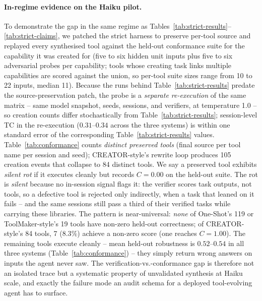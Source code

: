 \documentclass[sigconf,anonymous,natbib=false]{acmart}
\begin{document}
\paragraph{In-regime evidence on the Haiku pilot.} To demonstrate the gap in the same regime as Tables~\ref{tab:strict-results}--\ref{tab:strict-claims}, we patched the strict harness to preserve per-tool source and replayed every synthesised tool against the held-out conformance suite for the capability it was created for (five to six hidden unit inputs plus five to six adversarial probes per capability; tools whose creating task links multiple capabilities are scored against the union, so per-tool suite sizes range from 10 to 22 inputs, median 11). Because the runs behind Table~\ref{tab:strict-results} predate the source-preservation patch, the probe is a \emph{separate re-execution} of the same matrix -- same model snapshot, seeds, sessions, and verifiers, at temperature 1.0 -- so creation counts differ stochastically from Table~\ref{tab:strict-results}; session-level TC in the re-execution ($0.31$--$0.34$ across the three systems) is within one standard error of the corresponding Table~\ref{tab:strict-results} values. Table~\ref{tab:conformance} counts \emph{distinct preserved tools} (final source per tool name per session and seed); CREATOR-style's rewrite loop produces 105 creation events that collapse to 84 distinct tools. We say a preserved tool exhibits \emph{silent rot} if it executes cleanly but records $C{=}0.00$ on the held-out suite. The rot is \emph{silent} because no in-session signal flags it: the verifier scores task outputs, not tools, so a defective tool is rejected only indirectly, when a task that leaned on it fails -- and the same sessions still pass a third of their verified tasks while carrying these libraries. The pattern is near-universal: \emph{none} of One-Shot's 119 or ToolMaker-style's 19 tools have non-zero held-out correctness; of CREATOR-style's 84 tools, 7 ($8.3\%$) achieve a non-zero score (one reaches $C{=}1.00$). The remaining tools execute cleanly -- mean held-out robustness is $0.52$--$0.54$ in all three systems (Table~\ref{tab:conformance}) -- they simply return wrong answers on inputs the agent never saw. The verification-vs.-conformance gap is therefore not an isolated trace but a systematic property of unvalidated synthesis at Haiku scale, and exactly the failure mode an audit schema for a deployed tool-evolving agent has to surface.
\end{document}
